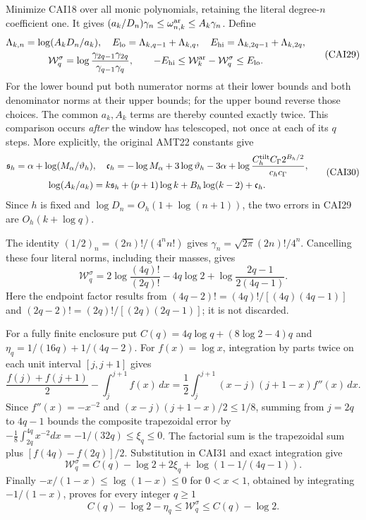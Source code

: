 \documentclass[11pt,a4paper]{article}
\begin{document}
Minimize CAI18 over all monic polynomials, retaining the literal
degree-$n$ coefficient one. It gives
$(a_k/D_n)\gamma_n\le\omega_{n,k}^{\rm ar}\le A_k\gamma_n$.
Define
\[
\begin{gathered}
 \Lambda_{k,n}=\log(A_kD_n/a_k),\quad
 E_{\rm lo}=\Lambda_{k,q-1}+\Lambda_{k,q},\quad
 E_{\rm hi}=\Lambda_{k,2q-1}+\Lambda_{k,2q},\\
 \mathcal W_q^\sigma=\log\frac{\gamma_{2q-1}\gamma_{2q}}
                                     {\gamma_{q-1}\gamma_q},\qquad
 -E_{\rm hi}\le\mathcal W_k^{\rm ar}-\mathcal W_q^\sigma\le E_{\rm lo}.
\end{gathered}\tag{CAI29}
\]
For the lower bound put both numerator norms at their lower bounds
and both denominator norms at their upper bounds; for the upper bound
reverse those choices. The common $a_k,A_k$ terms are thereby counted
exactly twice. This comparison occurs \emph{after} the window has
telescoped, not once at each of its $q$ steps. More explicitly, the
original AMT22 constants give
\[
\begin{gathered}
 \mathfrak s_h=\alpha+\log(M_\alpha/\vartheta_h),\quad
 \mathfrak c_h=-\log M_\alpha+3\log\vartheta_h-3\alpha+
       \log\frac{C_h^{\rm tilt}C_\Gamma2^{B_h/2}}{c_hc_\Gamma},\\
 \log(A_k/a_k)=k\mathfrak s_h+(p+1)\log k+B_h\log(k-2)+\mathfrak c_h.
\end{gathered}\tag{CAI30}
\]
Since $h$ is fixed and $\log D_n=O_h(1+\log(n+1))$, the two errors
in CAI29 are $O_h(k+\log q)$.

The identity $(1/2)_n=(2n)!/(4^nn!)$ gives
$\gamma_n=\sqrt{2\pi}(2n)!/4^n$. Cancelling these four literal norms,
including their masses, gives
\[
 \mathcal W_q^\sigma
 =2\log\frac{(4q)!}{(2q)!}-4q\log2
                       +\log\frac{2q-1}{2(4q-1)}.\tag{CAI31}
\]
Here the endpoint factor results from
$(4q-2)!=(4q)!/[(4q)(4q-1)]$ and
$(2q-2)!=(2q)!/[(2q)(2q-1)]$; it is not discarded.

For a fully finite enclosure put
$C(q)=4q\log q+(8\log2-4)q$ and
$\eta_q=1/(16q)+1/(4q-2)$. For $f(x)=\log x$, integration by parts
twice on each unit interval $[j,j+1]$ gives
\[
 \frac{f(j)+f(j+1)}2-\int_j^{j+1}f(x)\,dx
 =\frac12\int_j^{j+1}(x-j)(j+1-x)f''(x)\,dx.
\]
Since $f''(x)=-x^{-2}$ and $(x-j)(j+1-x)/2\le1/8$, summing from
$j=2q$ to $4q-1$ bounds the composite trapezoidal error by
$-\frac18\int_{2q}^{4q}x^{-2}dx=-1/(32q)\le\xi_q\le0$.
The factorial sum is the trapezoidal sum plus
$[f(4q)-f(2q)]/2$. Substitution in CAI31 and exact integration give
\[
 \mathcal W_q^\sigma=C(q)-\log2+2\xi_q+
                                  \log(1-1/(4q-1)).
\]
Finally $-x/(1-x)\le\log(1-x)\le0$ for $0<x<1$, obtained by
integrating $-1/(1-x)$, proves for every integer $q\ge1$
\[
 C(q)-\log2-\eta_q\le\mathcal W_q^\sigma\le C(q)-\log2.
 \tag{CAI32}
\]
\end{document}
